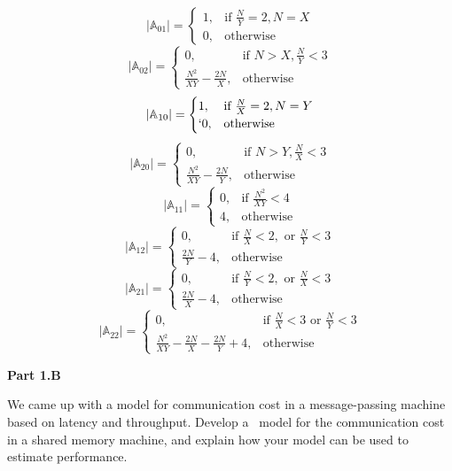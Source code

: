 \documentclass[12pt,twoside, parskip=full]{scrartcl}
\begin{document}
\begin{flushleft}
\begin{flushleft}
\[\]
\[
    |\mathbb{A}_{01}|= 
\begin{cases}
    1,& \text{if } \frac{N}{Y}=2, N=X\\
    0,              & \text{otherwise}
\end{cases}
\]
\[
    |\mathbb{A}_{02}|= 
\begin{cases}
   0,& \text{if } N>X, \frac{N}{Y}<3\\
   \frac{N^2}{XY} - \frac{2N}{X},              & \text{otherwise}
\end{cases}
\]
\[
    |\mathbb{A}_{10}|= 
\begin{cases}
    1,& \text{if } \frac{N}{X}=2, N=Y\\`
    0,              & \text{otherwise}
\end{cases}
\]
\[
    |\mathbb{A}_{20}|= 
\begin{cases}
   0,& \text{if } N>Y, \frac{N}{X}<3\\
   \frac{N^2}{XY} - \frac{2N}{Y},              & \text{otherwise}
\end{cases}
\]
\[
    |\mathbb{A}_{11}|= 
\begin{cases}
    0,& \text{if } \frac{N^2}{XY} < 4\\
    4,              & \text{otherwise}
\end{cases}
\]
\[
    |\mathbb{A}_{12}|= 
\begin{cases}
    0,& \text{if } \frac{N}{X} < 2, \text{ or } \frac{N}{Y} < 3\\
    \frac{2N}{Y} - 4,              & \text{otherwise}
\end{cases}
\]
\[
    |\mathbb{A}_{21}|= 
\begin{cases}
    0,& \text{if } \frac{N}{Y} < 2, \text{ or } \frac{N}{X} < 3\\
    \frac{2N}{X} - 4,              & \text{otherwise}
\end{cases}
\]
\[
    |\mathbb{A}_{22}|= 
\begin{cases}
    0,& \text{if } \frac{N}{X}<3 \text{ or } \frac{N}{Y} < 3\\
    \frac{N^2}{XY} - \frac{2N}{X} - \frac{2N}{Y} + 4,              & \text{otherwise}
\end{cases}
\]
\end{flushleft}
\end{flushleft}

\textbf{Part 1.B} 

We came up with a model for communication cost in a message-passing machine based on latency and throughput. Develop a  model for the communication cost in a shared memory machine, and explain how your model can be used to estimate performance.
\end{document}
